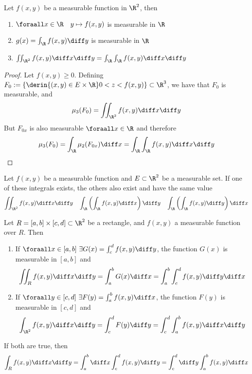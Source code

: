 \documentclass[../mmf.tex]{subfiles}
\begin{document}
\begin{thm}[Fubini]
	Let $f(x,y)$ be a measurable function in $\R^2$, then
	\begin{enumerate}
	\item $\foraall x\in\R\quad y\mapsto f(x,y)$ is measurable in $\R$
	\item $g(x)=\int_{\R}^{}f(x,y)\diff y$ is measurable in $\R$
	\item $\iint_{\R^2}f(x,y)\diff x\diff y=\int_{\R}^{}\int_{\R}^{}f(x,y)\diff x\diff y$
	\end{enumerate}
\end{thm}
\begin{proof}
	Let $f(x,y)\ge0$. Defining $F_0:=\left\{ \derin{(x,y)\in E\times\R}0<z<f(x,y) \right\}\subset\R^3$, we have that $F_0$ is measurable, and
	\begin{equation*}
		\mu_3(F_0)=\iint_{\R^2}f(x,y)\diff x\diff y
	\end{equation*}
	But $F_{0x}$ is also measurable $\foraall x\in\R$ and therefore
	\begin{equation*}
		\mu_3(F_0)=\int_{\R}\mu_2(F_{0x})\diff x=\int_{\R}\int_{\R} f(x,y)\diff x\diff y
	\end{equation*}
\end{proof}
\begin{thm}[Tonelli]
	Let $f(x,y)$ be a measurable function and $E\subset\R^2$ be a measurable set. If one of these integrals exists, the others also exist and have the same value
	\begin{equation*}
		\iint_{\R^2}^{}f(x,y)\diff x\diff y\quad\int_{\R}^{}\left( \int_{\R}^{}f(x,y)\diff x \right)\diff y\quad\int_{\R}^{}\left( \int_{\R}^{}f(x,y)\diff y \right)\diff x
	\end{equation*}
\end{thm}
\begin{thm}
	Let $R=[a,b]\times[c,d]\subset\R^2$ be a rectangle, and $f(x,y)$ a measurable function over $R$. Then\\
	\begin{enumerate}
	\item If $\foraall x\in[a,b]\ \exists G(x)=\int_{c}^{d}f(x,y)\diff y$, the function $G(x)$ is measurable in $[a,b]$ and
		\begin{equation*}
			\iint_Rf(x,y)\diff x\diff y=\int_{a}^{b}G(x)\diff x=\int_{a}^{b}\int_{c}^{d}f(x,y)\diff y\diff x
		\end{equation*}
	\item If $\foraall y\in[c,d]\ \exists F(y)=\int_{a}^{b}f(x,y)\diff x$, the function $F(y)$ is measurable in $[c,d]$ and
		\begin{equation*}
			\int_{\R^2}^{}f(x,y)\diff x\diff y=\int_{c}^{d}F(y)\diff y=\int_{c}^{d}\int_{a}^{b}f(x,y)\diff x\diff y
		\end{equation*}
	\end{enumerate}
	If both are true, then
	\begin{equation}
		\int_{R}^{}f(x,y)\diff x\diff y=\int_{a}^{b}\diff x\int_{c}^{d}f(x,y)\diff y=\int_{c}^{d}\diff y\int_{a}^{b}f(x,y)\diff x
		\label{eq:rectintegration}
	\end{equation}
\end{thm}
\end{document}
